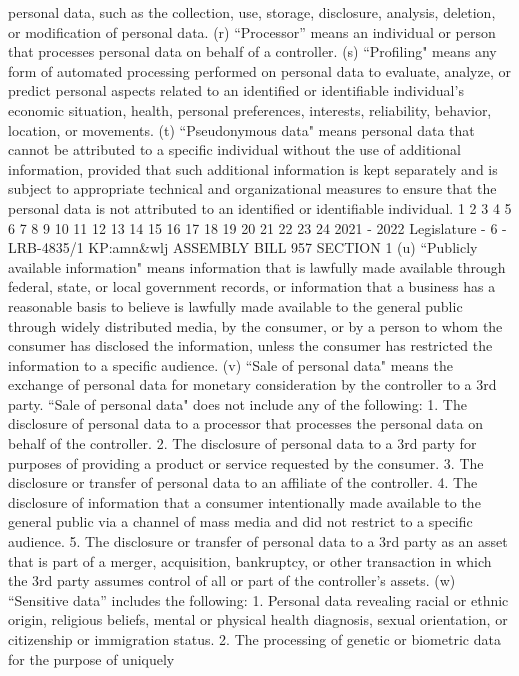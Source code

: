 personal data, such as the collection, use, storage, disclosure, analysis, deletion, or
modification of personal data.
(r) “Processor” means an individual or person that processes personal data on
behalf of a controller.
(s) “Profiling" means any form of automated processing performed on personal
data to evaluate, analyze, or predict personal aspects related to an identified or
identifiable individual's economic situation, health, personal preferences, interests,
reliability, behavior, location, or movements.
(t) “Pseudonymous data" means personal data that cannot be attributed to a
specific individual without the use of additional information, provided that such
additional information is kept separately and is subject to appropriate technical and
organizational measures to ensure that the personal data is not attributed to an
identified or identifiable individual.
1
2
3
4
5
6
7
8
9
10
11
12
13
14
15
16
17
18
19
20
21
22
23
24
2021 - 2022 Legislature - 6 - LRB-4835/1
KP:amn&wlj
 ASSEMBLY BILL 957 SECTION 1
(u) “Publicly available information" means information that is lawfully made
available through federal, state, or local government records, or information that a
business has a reasonable basis to believe is lawfully made available to the general
public through widely distributed media, by the consumer, or by a person to whom
the consumer has disclosed the information, unless the consumer has restricted the
information to a specific audience.
(v) “Sale of personal data" means the exchange of personal data for monetary
consideration by the controller to a 3rd party. “Sale of personal data" does not include
any of the following:
1. The disclosure of personal data to a processor that processes the personal
data on behalf of the controller.
2. The disclosure of personal data to a 3rd party for purposes of providing a
product or service requested by the consumer.
3. The disclosure or transfer of personal data to an affiliate of the controller.
4. The disclosure of information that a consumer intentionally made available
to the general public via a channel of mass media and did not restrict to a specific
audience.
5. The disclosure or transfer of personal data to a 3rd party as an asset that is
part of a merger, acquisition, bankruptcy, or other transaction in which the 3rd party
assumes control of all or part of the controller's assets.
(w) “Sensitive data” includes the following:
1. Personal data revealing racial or ethnic origin, religious beliefs, mental or
physical health diagnosis, sexual orientation, or citizenship or immigration status.
2. The processing of genetic or biometric data for the purpose of uniquely
